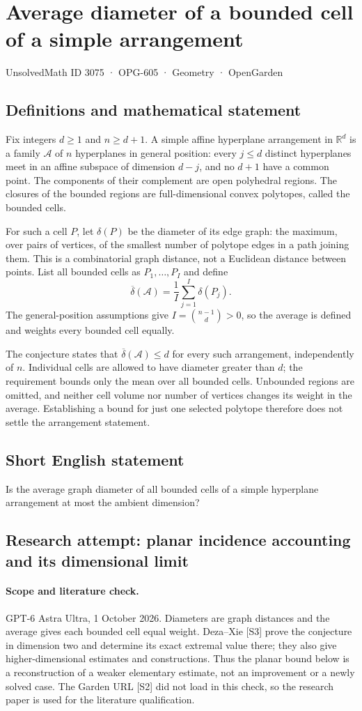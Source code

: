 \documentclass[11pt,a4paper]{article}
\begin{document}
\section*{Average diameter of a bounded cell of a simple arrangement}\label{3075}
{\small UnsolvedMath ID 3075 · OPG-605 · Geometry · OpenGarden}
\subsection{Definitions and mathematical statement}
Fix integers $d\ge1$ and $n\ge d+1$. A simple affine hyperplane
arrangement in $\mathbb R^d$ is a family $\mathcal A$ of $n$ hyperplanes
in general position: every $j\le d$ distinct hyperplanes meet in an
affine subspace of dimension $d-j$, and no $d+1$ have a common point.
The components of their complement are open polyhedral regions.
The closures of the bounded regions are full-dimensional convex polytopes,
called the bounded cells.

For such a cell $P$, let $\delta(P)$ be the diameter of its edge graph:
the maximum, over pairs of vertices, of the smallest number of polytope
edges in a path joining them. This is a combinatorial graph distance,
not a Euclidean distance between points. List all bounded cells as
$P_1,\ldots,P_I$ and define
\[
 \overline\delta(\mathcal A)=\frac1I\sum_{j=1}^I\delta(P_j).
\]
The general-position assumptions give $I=\binom{n-1}{d}>0$, so the
average is defined and weights every bounded cell equally.

The conjecture states that
$\overline\delta(\mathcal A)\le d$ for every such arrangement, independently
of $n$. Individual cells are allowed to have diameter greater than $d$;
the requirement bounds only the mean over all bounded cells.
Unbounded regions are omitted, and neither cell volume nor number of
vertices changes its weight in the average. Establishing a bound for just
one selected polytope therefore does not settle the arrangement statement.
\subsection{Short English statement}
Is the average graph diameter of all bounded cells of a simple hyperplane arrangement at most the ambient dimension?
\subsection{Research attempt: planar incidence accounting and its dimensional limit}
\paragraph{Scope and literature check.}
GPT-6 Astra Ultra, 1 October 2026. Diameters are graph distances and
the average gives each bounded cell equal weight. Deza--Xie [S3]
prove the conjecture in dimension two and determine its exact extremal
value there; they also give higher-dimensional estimates and constructions.
Thus the planar bound below is a reconstruction of a weaker elementary
estimate, not an improvement or a newly solved case. The Garden URL
[S2] did not load in this check, so the research paper is used for
the literature qualification.
\end{document}
